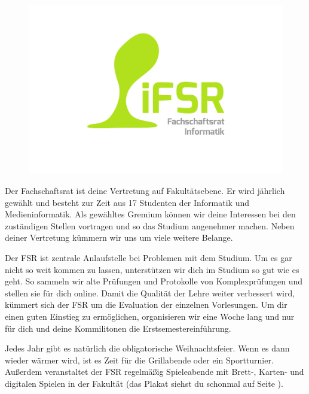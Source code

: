 

\begin{figure}\ \\[-1cm]
\flushright\includegraphics[width=\linewidth, trim=160 100 150 100, clip]{img/fsr_logo}
\end{figure}

Der Fachschaftsrat ist deine Vertretung auf Fakultätsebene.
Er wird jährlich gewählt und besteht zur Zeit aus 17 Studenten der Informatik und Medieninformatik.
Als gewähltes Gremium können wir deine Interessen bei den zuständigen Stellen vortragen und so das Studium angenehmer machen.
Neben deiner Vertretung kümmern wir uns um viele weitere Belange.

Der FSR ist zentrale Anlaufstelle bei Problemen mit dem Studium.
Um es gar nicht so weit kommen zu lassen, unterstützen wir dich im Studium so gut wie es geht.
So sammeln wir alte Prüfungen und Protokolle von Komplexprüfungen und stellen sie für dich online.
Damit die Qualität der Lehre weiter verbessert wird, kümmert sich der FSR um die Evaluation der einzelnen Vorlesungen.
Um dir einen guten Einstieg zu ermöglichen, organisieren wir eine Woche lang und nur für dich und deine Kommilitonen die Erstsemestereinführung.

Jedes Jahr gibt es natürlich die obligatorische Weihnachtsfeier.
Wenn es dann wieder wärmer wird, ist es Zeit für die Grillabende oder ein Sportturnier. \\
Außerdem veranstaltet der FSR regelmäßig Spieleabende mit Brett-, Karten- und digitalen Spielen in der Fakultät (das Plakat siehst du schonmal auf Seite \pageref{spieleabendplakat}).

